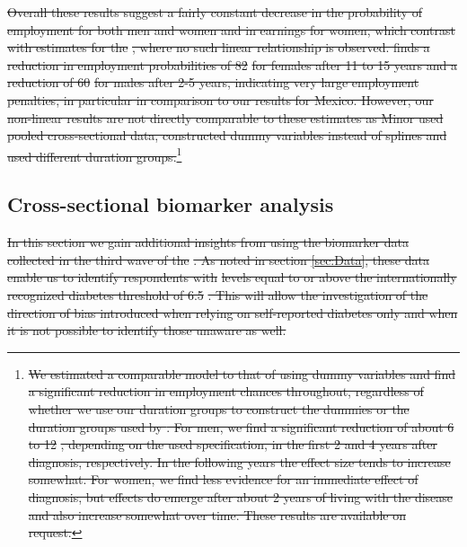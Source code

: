 \documentclass[12pt,english]{article}
\providecommand{\DIFdeltex}[1]{{\protect\color{red}\sout{#1}}}                      %
\providecommand{\DIFdelbegin}{} %
\providecommand{\DIFdelend}{} %
\providecommand{\DIFdel}[1]{\texorpdfstring{\DIFdeltex{#1}}{}} %
\begin{document}
\DIFdel{Overall these results suggest a fairly constant decrease in the probability of employment for both men and women and in earnings for women, which contrast with estimates for the }%
\DIFdel{, where no such linear relationship is observed.  \textcite{Minor2013} finds a reduction in employment probabilities of 82 }%
\DIFdel{for females after 11 to 15 years and a reduction of 60 }%
\DIFdel{for males after 2-5 years, indicating very large employment penalties, in particular in comparison to our results for Mexico. However, our non-linear results are not directly comparable to these estimates as Minor used pooled cross-sectional data, constructed dummy variables instead of splines and used different duration groups.}\footnote{\DIFdel{We estimated a comparable model to that of \textcite{Minor2013} using dummy variables and find a significant reduction in employment chances throughout, regardless of whether we use our duration groups to construct the dummies or the duration groups used by \textcite{Minor2013}. For men, we find a significant reduction of about 6 to 12 }%
\DIFdel{, depending on the used specification, in the first 2 and 4 years after diagnosis, respectively. In the following years the effect size tends to increase somewhat. For women, we find less evidence for an immediate effect of diagnosis, but effects do emerge after about 2 years of living with the disease and also increase somewhat over time. These results are available on request.}}
\addtocounter{footnote}{-1}%
\DIFdelend \FloatBarrier

\subsection{Cross-sectional biomarker analysis}


\DIFdelbegin \DIFdel{In this section we gain additional insights from using the biomarker data collected in the
third wave of the }%
\DIFdel{. As noted in section \ref{sec:Data}, these data enable us to identify respondents with
}%
\DIFdel{levels equal to or above the internationally recognized diabetes threshold of 6.5}%
\DIFdel{. This will allow the investigation of the direction of bias introduced when relying on self-reported diabetes only and when it is not possible to identify those unaware as well.
}%
\end{document}
